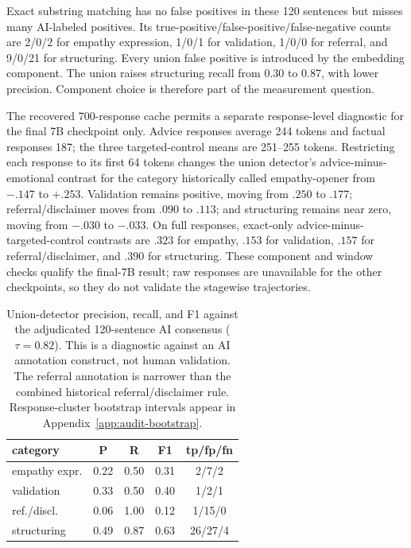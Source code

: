 \documentclass[11pt]{article}
\begin{document}
Exact substring matching has no false positives in these 120 sentences but
misses many AI-labeled positives. Its true-positive/false-positive/false-negative
counts are 2/0/2 for empathy expression, 1/0/1 for validation, 1/0/0 for
referral, and 9/0/21 for structuring. Every union false positive is introduced
by the embedding component. The union raises structuring recall from 0.30 to
0.87, with lower precision. Component choice is therefore part of the
measurement question.

The recovered 700-response cache permits a separate response-level diagnostic
for the final 7B checkpoint only. Advice responses average 244 tokens and
factual responses 187; the three targeted-control means are 251--255 tokens.
Restricting each response to its first 64 tokens changes the union detector's
advice-minus-emotional contrast for the category historically called
empathy-opener from $-.147$ to $+.253$. Validation remains positive, moving
from $.250$ to $.177$; referral/disclaimer moves from $.090$ to $.113$; and
structuring remains near zero, moving from $-.030$ to $-.033$. On full
responses, exact-only advice-minus-targeted-control contrasts are $.323$ for
empathy, $.153$ for validation, $.157$ for referral/disclaimer, and $.390$ for
structuring. These component and window checks qualify the final-7B result; raw
responses are unavailable for the other checkpoints, so they do not validate
the stagewise trajectories.

\begin{table}[t]
\centering
\small
\begin{tabular}{lcccc}
\toprule
category & P & R & F1 & tp/fp/fn \\
\midrule
empathy expr. & 0.22 & 0.50 & 0.31 & 2/7/2 \\
validation & 0.33 & 0.50 & 0.40 & 1/2/1 \\
ref./discl. & 0.06 & 1.00 & 0.12 & 1/15/0 \\
structuring & 0.49 & 0.87 & 0.63 & 26/27/4 \\
\bottomrule
\end{tabular}
\caption{Union-detector precision, recall, and F1 against the adjudicated
120-sentence AI consensus ($\tau=0.82$). This is a diagnostic against an AI
annotation construct, not human validation. The referral annotation is narrower
than the combined historical referral/disclaimer rule. Response-cluster
bootstrap intervals appear in Appendix~\ref{app:audit-bootstrap}.}
\label{tab:detval}
\end{table}
\end{document}
